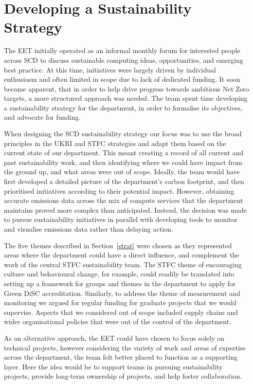 \documentclass[sigconf]{acmart}
\begin{document}
\section{Developing a Sustainability Strategy}

The EET initially operated as an informal monthly forum for interested people across SCD to discuss sustainable computing ideas, opportunities, and emerging best practice. At this time, initiatives were largely driven by individual enthusiasm and often limited in scope due to lack of dedicated funding. It soon became apparent, that in order to help drive progress towards ambitious Net Zero targets, a more structured approach was needed. The team spent time developing a sustainability strategy for the department, in order to formalise its objectives, and advocate for funding.

When designing the SCD sustainability strategy our focus was to use the broad principles in the UKRI\cite{UKRINetZeroStrategy} and STFC\cite{STFCNetZeroStrategy} strategies and adapt them based on the current state of our department.  This meant creating a record of all current and past sustainability work, and then identifying where we could have impact from the ground up, and what areas were out of scope. Ideally, the team would have first developed a detailed picture of the department's carbon footprint, and then prioritised initiatives according to their potential impact. However, obtaining accurate emissions data across the mix of compute services that the department maintains proved more complex than anticipated. Instead, the decision was made to pursue sustainability initiatives in parallel with developing tools to monitor and visualise emissions data rather than delaying action.

The five themes described in Section~\ref{strat} were chosen as they represented areas where the department could have a direct influence, and complement the work of the central STFC sustainability team. The STFC theme of encouraging culture and behavioural change,  for example, could readily be translated into setting up a framework for groups and themes in the department to apply for Green DiSC accreditation\cite{GreenDiSC}. Similarly, to address the theme of measurement and monitoring we argued for regular funding for graduate projects that we would supervise. Aspects that we considered out of scope included supply chains and wider organisational policies that were out of the control of the department.

As an alternative approach, the EET could have chosen to focus solely on technical projects, however considering the variety of work and areas of expertise across the department, the team felt better placed to function as a supporting layer. Here the idea would be to support teams in pursuing sustainability projects, provide long-term ownership of projects, and help foster collaboration.
\end{document}

